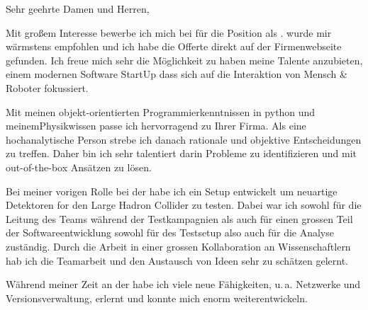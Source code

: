 \documentclass[12pt]{extarticle}
\author{Michael Reichmann}
\date{Wrocław, \today}
\begin{document}
%
\maketitle %
%
%
%
Sehr geehrte Damen und Herren,\par
%
Mit großem Interesse bewerbe ich mich bei \@company für die Position als \@position.
\@company wurde mir wärmstens empfohlen und ich habe die Offerte direkt auf der Firmenwebseite gefunden.
Ich freue mich sehr die Möglichkeit zu haben meine Talente \@company anzubieten, einem modernen Software StartUp dass sich auf die Interaktion von Mensch 
\& Roboter fokussiert.\par
%
%
%
Mit meinen objekt-orientierten Programmierkenntnissen in python und meinem\linebreak Physikwissen passe ich hervorragend zu Ihrer Firma. 
Als eine hochanalytische Person strebe ich danach rationale und objektive Entscheidungen zu treffen.
Daher bin ich sehr talentiert darin Probleme zu identifizieren und mit out-of-the-box Ansätzen zu lösen.\par
%
%
%
Bei meiner vorigen Rolle bei der \@oldcomp habe ich ein Setup entwickelt um neuartige Detektoren for den Large Hadron Collider zu testen.
Dabei war ich sowohl für die Leitung des Teams während der Testkampagnien als auch für einen grossen Teil der Softwareentwicklung sowohl für des Testsetup also auch für die Analyse zuständig.
Durch die Arbeit in einer grossen Kollaboration an Wissenschaftlern hab ich die Teamarbeit und den Austausch von Ideen sehr zu schätzen gelernt.\par
%
%
%
Während meiner Zeit an der \@oldcomp habe ich viele neue Fähigkeiten, u.\,a. Netzwerke und Versionsverwaltung, erlernt und konnte mich enorm weiterentwickeln.
\end{document}
